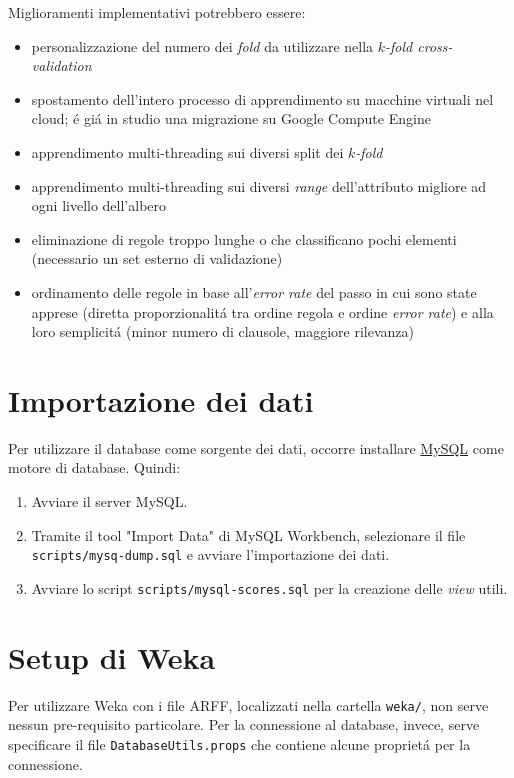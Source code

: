 \documentclass[preprint]{acm_proc_article-sp}
\begin{document}
Miglioramenti implementativi potrebbero essere:
\begin{itemize}
\item personalizzazione del numero dei \textit{fold} da utilizzare nella $k$\textit{-fold cross-validation}
\item spostamento dell'intero processo di apprendimento su macchine virtuali nel cloud; \'e gi\'a in studio una migrazione su Google Compute Engine
\item apprendimento multi-threading sui diversi split dei $k$\textit{-fold}
\item apprendimento multi-threading sui diversi \textit{range} dell'attributo migliore ad ogni livello dell'albero 
\item eliminazione di regole troppo lunghe o che classificano pochi elementi (necessario un set esterno di validazione)
\item ordinamento delle regole in base all'\textit{error rate} del passo in cui sono state apprese (diretta proporzionalit\'a tra ordine regola e ordine \textit{error rate}) e alla loro semplicit\'a (minor numero di clausole, maggiore rilevanza)
\end{itemize}



\appendix

\section{Importazione dei dati}
\label{appendix-data}
Per utilizzare il database come sorgente dei dati, occorre installare \href{http://www.mysql.com/}{MySQL} come motore di database.
Quindi:

\begin{enumerate}
\item Avviare il server MySQL.
\item Tramite il tool "Import Data" di MySQL Workbench, selezionare il file \verb|scripts/mysq-dump.sql| e avviare l'importazione dei dati.
\item Avviare lo script \verb|scripts/mysql-scores.sql| per la creazione delle \textit{view} utili.
\end{enumerate}

\section{Setup di Weka}
\label{appendix-weka}
Per utilizzare Weka con i file ARFF, localizzati nella cartella \verb|weka/|, non serve nessun pre-requisito particolare. Per la connessione al database, invece, serve specificare il file \verb|DatabaseUtils.props| che contiene alcune propriet\'a per la connessione.
\end{document}
